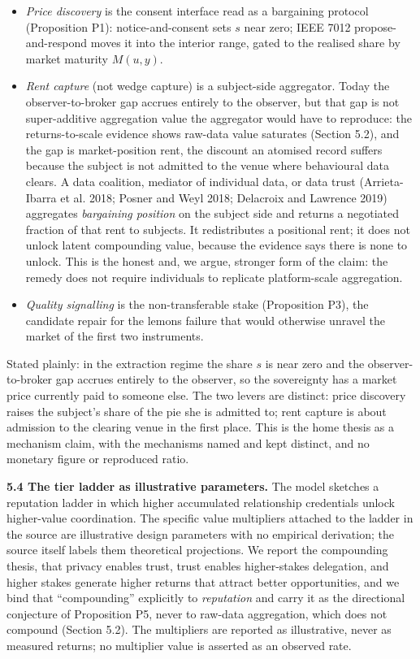 \documentclass[
  11pt,
]{article}
\newcounter{none} %
\providecommand{\tightlist}{%
  \setlength{\itemsep}{0pt}\setlength{\parskip}{0pt}}
\begin{document}
\begin{itemize}
\tightlist
\item
  \emph{Price discovery} is the consent interface read as a bargaining
  protocol (Proposition P1): notice-and-consent sets \(s\) near zero;
  IEEE 7012 propose-and-respond moves it into the interior range, gated
  to the realised share by market maturity \(M(u,y)\).
\item
  \emph{Rent capture} (not wedge capture) is a subject-side aggregator.
  Today the observer-to-broker gap accrues entirely to the observer, but
  that gap is not super-additive aggregation value the aggregator would
  have to reproduce: the returns-to-scale evidence shows raw-data value
  saturates (Section 5.2), and the gap is market-position rent, the
  discount an atomised record suffers because the subject is not
  admitted to the venue where behavioural data clears. A data coalition,
  mediator of individual data, or data trust (Arrieta-Ibarra et al.
  2018; Posner and Weyl 2018; Delacroix and Lawrence 2019) aggregates
  \emph{bargaining position} on the subject side and returns a
  negotiated fraction of that rent to subjects. It redistributes a
  positional rent; it does not unlock latent compounding value, because
  the evidence says there is none to unlock. This is the honest and, we
  argue, stronger form of the claim: the remedy does not require
  individuals to replicate platform-scale aggregation.
\item
  \emph{Quality signalling} is the non-transferable stake (Proposition
  P3), the candidate repair for the lemons failure that would otherwise
  unravel the market of the first two instruments.
\end{itemize}

Stated plainly: in the extraction regime the share \(s\) is near zero
and the observer-to-broker gap accrues entirely to the observer, so the
sovereignty has a market price currently paid to someone else. The two
levers are distinct: price discovery raises the subject's share of the
pie she is admitted to; rent capture is about admission to the clearing
venue in the first place. This is the home thesis as a mechanism claim,
with the mechanisms named and kept distinct, and no monetary figure or
reproduced ratio.

\textbf{5.4 The tier ladder as illustrative parameters.} The model
sketches a reputation ladder in which higher accumulated relationship
credentials unlock higher-value coordination. The specific value
multipliers attached to the ladder in the source are illustrative design
parameters with no empirical derivation; the source itself labels them
theoretical projections. We report the compounding thesis, that privacy
enables trust, trust enables higher-stakes delegation, and higher stakes
generate higher returns that attract better opportunities, and we bind
that ``compounding'' explicitly to \emph{reputation} and carry it as the
directional conjecture of Proposition P5, never to raw-data aggregation,
which does not compound (Section 5.2). The multipliers are reported as
illustrative, never as measured returns; no multiplier value is asserted
as an observed rate.
\end{document}
